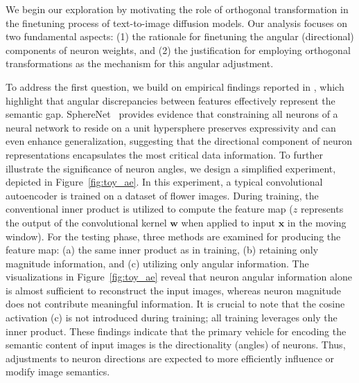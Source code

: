 We begin our exploration by motivating the role of orthogonal transformation in the finetuning process of text-to-image diffusion models. Our analysis focuses on two fundamental aspects: (1) the rationale for finetuning the angular (directional) components of neuron weights, and (2) the justification for employing orthogonal transformations as the mechanism for this angular adjustment.

To address the first question, we build on empirical findings reported in \cite{liu2018decoupled,chen2020angular}, which highlight that angular discrepancies between features effectively represent the semantic gap. SphereNet~\cite{liu2017deep} provides evidence that constraining all neurons of a neural network to reside on a unit hypersphere preserves expressivity and can even enhance generalization, suggesting that the directional component of neuron representations encapsulates the most critical data information. To further illustrate the significance of neuron angles, we design a simplified experiment, depicted in Figure~\ref{fig:toy_ae}. In this experiment, a typical convolutional autoencoder is trained on a dataset of flower images. During training, the conventional inner product is utilized to compute the feature map ($z$ represents the output of the convolutional kernel $\bm{w}$ when applied to input $\bm{x}$ in the moving window). For the testing phase, three methods are examined for producing the feature map: (a) the same inner product as in training, (b) retaining only magnitude information, and (c) utilizing only angular information. The visualizations in Figure~\ref{fig:toy_ae} reveal that neuron angular information alone is almost sufficient to reconstruct the input images, whereas neuron magnitude does not contribute meaningful information. It is crucial to note that the cosine activation (c) is not introduced during training; all training leverages only the inner product. These findings indicate that the primary vehicle for encoding the semantic content of input images is the directionality (angles) of neurons. Thus, adjustments to neuron directions are expected to more efficiently influence or modify image semantics.

